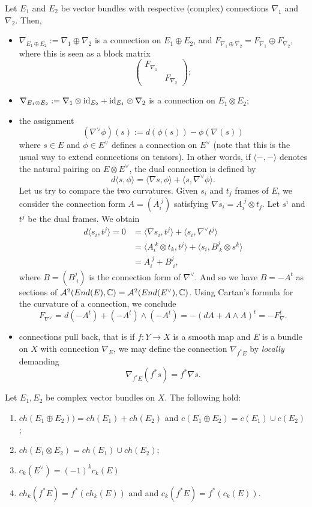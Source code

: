 Let $E_1$ and $E_2$ be vector bundles with respective (complex) connections $\nabla_1$ and $\nabla_2$. Then,
\begin{itemize}
	\item $\nabla_{E_1\oplus E_2}:=\nabla_1\oplus\nabla_2$ is a connection on $E_1\oplus E_2$, and $F_{\nabla_1\oplus\nabla_2}=F_{\nabla_1}\oplus F_{\nabla_2}$, where this is seen as a block matrix
	\[\begin{pmatrix}
		F_{\nabla_1}&\\&F_{\nabla_2}
	\end{pmatrix}; \]
	\item $\nabla_{E_1\otimes E_2}:=\nabla_1\otimes \text{id}_{E_2}+\text{id}_{E_1}\otimes \nabla_2$ is a connection on $E_1\otimes E_2$;
	\item the assignment
	\[
	(\nabla^\vee \phi)(s):=d(\phi(s))-\phi(\nabla(s))
	\]
	where $s\in E$ and $\phi\in E^\vee$ defines a connection on $E^\vee$ (note that this is the usual way to extend connections on tensors). In other words, if $\langle-,-\rangle$ denotes the natural pairing on $E\otimes E^\vee$, the dual connection is defined by
	\[
	d\langle s,\phi\rangle=\langle\nabla s,\phi\rangle+\langle s,\nabla^\vee \phi\rangle.
	\]
	Let us try to compare the two curvatures. Given $s_i$ and $t_j$ frames of $E$, we consider the connection form $A=(A_i^{\;j})$ satisfying $\nabla s_i=A_i^{\;j}\otimes t_j$. Let $s^i$ and $t^j$ be the dual frames. We obtain
	\begin{align*}
		d\langle s_i,t^j\rangle=0&=\langle \nabla s_i,t^j\rangle+\langle s_i,\nabla^\vee t^j\rangle\\
		&=\langle A_i^{\;k}\otimes t_k,t^j\rangle+\langle s_i,B^j_{\;k}\otimes s^k\rangle\\
		&=A_i^{\;j}+B^j_{\; i},
	\end{align*}
	where $B=(B^j_{\; i})$ is the connection form of $\nabla^\vee$. And so we have $B=-A^t$ as sections of $\mathcal{A}^2(End(E),\mathbb C)=\mathcal{A}^2(End(E^\vee),\mathbb C)$. Using Cartan's formula for the curvature of a connection, we conclude
	\[
	F_{\nabla^\vee}=d(-A^t)+(-A^t)\wedge(-A^t)=-(dA+A\wedge A)^t=-F_{\nabla}^t.
	\]
	\item connections pull back, that is if $f:Y\to X$ is a smooth map and $E$ is a bundle on $X$ with connection $\nabla_E$, we may define the connection $\nabla_{f^*E}$ by \emph{locally} demanding
	\[
	\nabla_{f^*E}(f^*s)=f^*\nabla s.
	\]
\end{itemize}


\begin{corollary}
	Let $E_1,E_2$ be complex vector bundles on $X$. The following hold:
	\begin{enumerate}
		\item $ch(E_1\oplus E_2))=ch(E_1)+ch(E_2)$ and $c(E_1\oplus E_2)=c(E_1)\cup c(E_2)$;
		\item $ch(E_1\otimes E_2)=ch(E_1)\cup ch(E_2)$;
		\item $c_k(E^\vee)=(-1)^k c_k(E)$
		\item $ch_k(f^*E)=f^*(ch_k(E))$ and  and $c_k(f^*E)=f^*(c_k(E))$.
	\end{enumerate}
\end{corollary}

